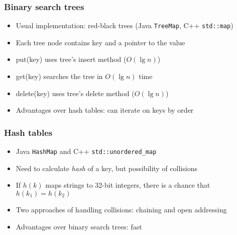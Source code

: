 \documentclass{beamer}
\begin{document}
\begin{frame}
 \frametitle{Binary search trees}
 \begin{itemize}
  \item Usual implementation: red-black trees (Java \texttt{TreeMap},
        C++ \texttt{std::map})
  \item Each tree node contains key and a pointer to the value
  \item put(key) uses tree's insert method ($O(\lg n)$)
  \item get(key) searches the tree in $O(\lg n)$ time
  \item delete(key) uses tree's delete method ($O(\lg n)$)
  \item Advantages over hash tables: can iterate on keys by order
 \end{itemize}
\end{frame}

\begin{frame}
 \frametitle{Hash tables}
 \begin{itemize}
  \item Java \texttt{HashMap} and C++ \texttt{std::unordered\_map}
  \item Need to calculate \emph{hash} of a key, but possibility of
        collisions
  \item If $h(k)$ maps strings to 32-bit integers, there is a chance
        that $h(k_1) = h(k_2)$
  \item Two approaches of handling collisions: chaining and open
        addressing
  \item Advantages over binary search trees: fast
 \end{itemize}
\end{frame}
\end{document}
